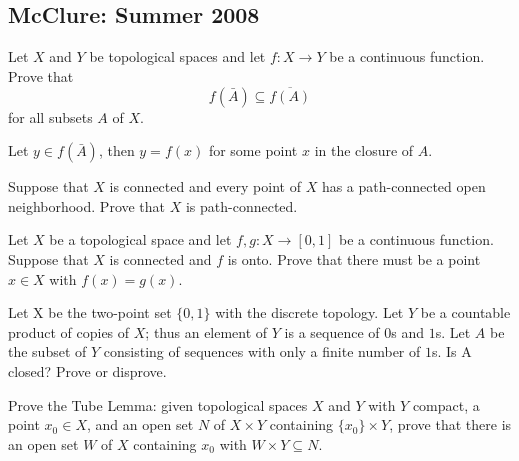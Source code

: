 \subsection{McClure: Summer 2008}
\setcounter{exercise}{0}
\setcounter{equation}{0}

\begin{problem}
  Let \(X\) and \(Y\) be topological spaces and let \(f\colon X\to Y\) be a
  continuous function. Prove that
  \[
    f(\bar A)\subseteq\overline{f(A)}
  \]
  for all subsets \(A\) of \(X\).
\end{problem}
\begin{solution}
  Let \(y\in f(\bar A)\), then \(y=f(x)\) for some point \(x\) in the
  closure of \(A\). 
\end{solution}

\begin{problem}
  Suppose that \(X\) is connected and every point of \(X\) has a
  path-connected open neighborhood. Prove that \(X\) is path-connected.
\end{problem}
\begin{solution}
\end{solution}

\begin{problem}
  Let \(X\) be a topological space and let \(f,g\colon X\to[0,1]\) be a
  continuous function. Suppose that \(X\) is connected and \(f\) is
  onto. Prove that there must be a point \(x\in X\) with \(f(x)=g(x)\).
\end{problem}
\begin{solution}
\end{solution}

\begin{problem}
  Let X be the two-point set \(\{0,1\}\) with the discrete topology. Let
  \(Y\) be a countable product of copies of \(X\); thus an element of \(Y\)
  is a sequence of \(0\)s and \(1\)s.  Let \(A\) be the subset of \(Y\)
  consisting of sequences with only a finite number of \(1\)s. Is A closed?
  Prove or disprove.
\end{problem}
\begin{solution}
\end{solution}

\begin{problem}
  Prove the Tube Lemma: given topological spaces \(X\) and \(Y\) with \(Y\)
  compact, a point \(x_0\in X\), and an open set \(N\) of \(X\times Y\)
  containing \(\{x_0\}\times Y\), prove that there is an open set \(W\) of
  \(X\) containing \(x_0\) with \(W\times Y\subseteq N\).
\end{problem}
\begin{solution}
\end{solution}

